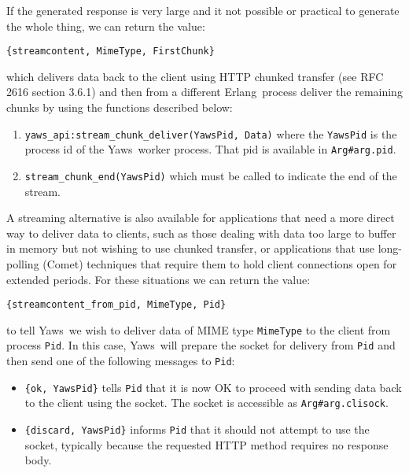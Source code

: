 \documentclass[11pt,oneside,english]{book}
\newcommand{\Erlang}            %
        {{\sc Erlang}}
\newcommand{\Yaws}            %
        {{\sc Yaws}}
\begin{document}
If the generated response is very large and it not possible or
practical to generate the whole thing, we can return the value:

\begin{verbatim}
{streamcontent, MimeType, FirstChunk}
\end{verbatim}

\noindent which delivers data back to the client using HTTP chunked
transfer (see RFC 2616 section 3.6.1) and then from a different
\Erlang\ process deliver the remaining chunks by using the functions
described below:

\begin{enumerate}
\item \verb+yaws_api:stream_chunk_deliver(YawsPid, Data)+ where the
  \verb+YawsPid+ is the process id of the \Yaws\ worker process. That
  pid is available in \verb+Arg#arg.pid+.

\item \verb+stream_chunk_end(YawsPid)+ which must be called to
  indicate the end of the stream.
\end{enumerate}

A streaming alternative is also available for applications that need a
more direct way to deliver data to clients, such as those dealing with
data too large to buffer in memory but not wishing to use chunked
transfer, or applications that use long-polling (Comet) techniques
that require them to hold client connections open for extended
periods. For these situations we can return the value:

\begin{verbatim}
{streamcontent_from_pid, MimeType, Pid}
\end{verbatim}

\noindent to tell \Yaws\ we wish to deliver data of MIME type
\verb+MimeType+ to the client from process \verb+Pid+. In this case,
\Yaws\ will prepare the socket for delivery from \verb+Pid+ and then
send one of the following messages to \verb+Pid+:
\begin{itemize}
\item \verb+{ok, YawsPid}+ tells \verb+Pid+ that it is now OK to
  proceed with sending data back to the client using the socket. The
  socket is accessible as \verb+Arg#arg.clisock+.

\item \verb+{discard, YawsPid}+ informs \verb+Pid+ that it should not
  attempt to use the socket, typically because the requested HTTP
  method requires no response body.
\end{itemize}
\end{document}
